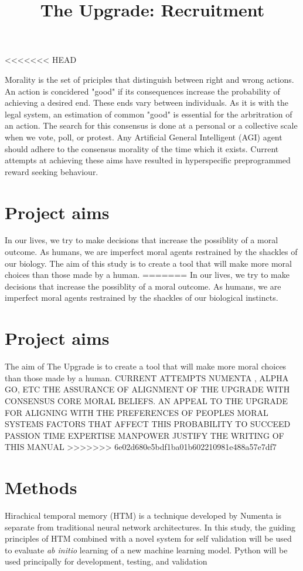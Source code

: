 \documentclass[12pt]{article}
\title{The Upgrade: Recruitment}
\date{\vspace{-5ex}}
\author{\vspace{-5ex}}
\begin{document}
\maketitle

<<<<<<< HEAD

Morality is the set of priciples that distinguish between right and wrong actions. An action is concidered "good" if its consequences increase the probability of achieving a desired end. These ends vary between individuals. As it is with the legal system, an estimation of common "good" is essential for the arbritration of an action. The search for this consensus is done at a personal or a collective scale when we vote, poll, or protest.  Any Artificial General Intelligent (AGI) agent should adhere to the consensus morality of the time which it exists. Current attempts at achieving these aims have resulted in hyperspecific preprogrammed reward seeking behaviour.

\section*{Project aims}
In our lives, we try to make decisions that increase the possiblity of a moral outcome. As humans, we are imperfect moral agents restrained by the shackles of our biology. The aim of this study is to create a tool that will make more moral choices than those made by a human. 
=======
In our lives, we try to make decisions that increase the possiblity of a moral outcome. As humans, we are imperfect moral agents restrained by the shackles of our biological instincts. 

\section*{Project aims}
The aim of The Upgrade is to create a tool that will make more moral choices than those made by a human. 
CURRENT ATTEMPTS
NUMENTA \cite{numentahome}, ALPHA GO, ETC
THE ASSURANCE OF ALIGNMENT OF THE UPGRADE WITH CONSENSUS CORE MORAL BELIEFS.
AN APPEAL TO THE UPGRADE FOR ALIGNING WITH THE PREFERENCES OF PEOPLES MORAL SYSTEMS
FACTORS THAT AFFECT THIS PROBABILITY TO SUCCEED
PASSION
TIME
EXPERTISE
MANPOWER
JUSTIFY THE WRITING OF THIS MANUAL 
>>>>>>> 6e02d680e5bdf1ba01b602210981e488a57e7df7

\section*{Methods}
Hirachical temporal memory (HTM) is a technique developed by Numenta \cite{numentahome} is separate from traditional neural network architectures.  In this study, the guiding principles of HTM combined with a novel system for self validation will be used to evaluate \emph{ab initio} learning of a new machine learning model. Python will be used principally for development, testing, and validation
\end{document}
